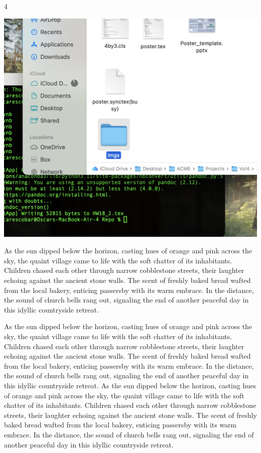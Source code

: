 \documentclass[a0]{4by3}
\newcommand{\NumColumns}{4}
\begin{document}
\begin{minipage}{\linewidth + 2\fboxsep}
\begin{multicols*}{\NumColumns}
    
        \begin{center}
          \includegraphics[width=1\linewidth,trim={0 8cm 0 10cm},clip]{./imgs/img.png}
        \end{center}
        


          \columnbreak  
 As the sun dipped below the horizon, casting hues of orange and pink across the sky, the quaint village came to life with the soft chatter of its inhabitants. Children chased each other through narrow cobblestone streets, their laughter echoing against the ancient stone walls. The scent of freshly baked bread wafted from the local bakery, enticing passersby with its warm embrace. In the distance, the sound of church bells rang out, signaling the end of another peaceful day in this idyllic countryside retreat.

  As the sun dipped below the horizon, casting hues of orange and pink across the sky, the quaint village came to life with the soft chatter of its inhabitants. Children chased each other through narrow cobblestone streets, their laughter echoing against the ancient stone walls. The scent of freshly baked bread wafted from the local bakery, enticing passersby with its warm embrace. In the distance, the sound of church bells rang out, signaling the end of another peaceful day in this idyllic countryside retreat.
 As the sun dipped below the horizon, casting hues of orange and pink across the sky, the quaint village came to life with the soft chatter of its inhabitants. Children chased each other through narrow cobblestone streets, their laughter echoing against the ancient stone walls. The scent of freshly baked bread wafted from the local bakery, enticing passersby with its warm embrace. In the distance, the sound of church bells rang out, signaling the end of another peaceful day in this idyllic countryside retreat.


\end{multicols*}
\end{minipage}
\end{document}
